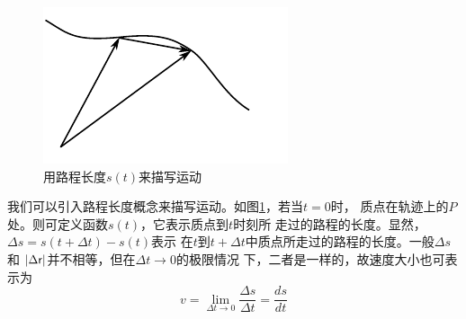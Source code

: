 \setlength{\mathindent}{6em}
\begin{figure}
    \vspace{-6em}
    \centering
    \small
    \includegraphics{figure/fig01.13}
    \caption{用路程长度$s(t)$来描写运动}
    \label{fig:01.13}
\end{figure}
\noindent 我们可以引入路程长度概念来描写运动。如图\ref{fig:01.13}，若当$t=0$时，
质点在轨迹上的$P$处。则可定义函数$s(t)$，它表示质点到$t$时刻所
走过的路程的长度。显然，$\Delta s=s(t+\Delta t)-s(t)$表示
在$t$到$t+\Delta t$中质点所走过的路程的长度。一般$\Delta s$和
$|\Delta {\boldmath{\mathsf{r}}}|$并不相等，但在$\Delta t \rightarrow 0$的极限情况
下，二者是一样的，故速度大小也可表示为
\begin{equation}\label{eqn:01.07.05}
    v=\lim_{\Delta t \rightarrow 0}\frac{\Delta s}{\Delta t}=\frac{ds}{dt}
\end{equation}

